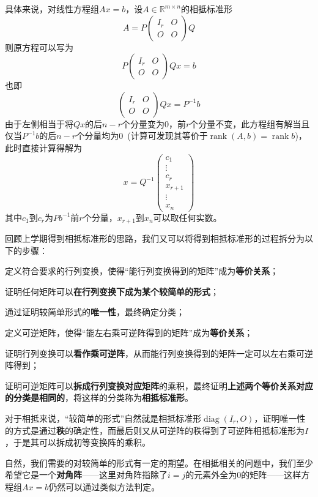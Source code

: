 \documentclass[a4paper,UTF8,fontset=windows,AutoFakeBold]{ctexart}
\DeclareMathOperator{\diag}{diag}
\DeclareMathOperator{\rank}{rank}
\begin{document}
具体来说，对线性方程组$Ax=b$，设$A\in\mathbb{R}^{m\times n}$的相抵标准形
$$A=P\begin{pmatrix}I_r&O\\O&O\end{pmatrix}Q$$
则原方程可以写为
$$P\begin{pmatrix}I_r&O\\O&O\end{pmatrix}Qx=b$$
也即
$$\begin{pmatrix}I_r&O\\O&O\end{pmatrix}Qx=P^{-1}b$$
由于左侧相当于将$Qx$的后$n-r$个分量变为0，前$r$个分量不变，此方程组有解当且仅当$P^{-1}b$的后$n-r$个分量均为0\ (计算可发现其等价于$\rank(A,b)=\rank b$)，此时直接计算得解为
$$x=Q^{-1}\begin{pmatrix}c_1\\\vdots\\c_r\\x_{r+1}\\\vdots\\x_n\end{pmatrix}$$
其中$c_1$到$c_r$为$Pb^{-1}$前$r$个分量，$x_{r+1}$到$x_n$可以取任何实数。

回顾上学期得到相抵标准形的思路，我们又可以将得到相抵标准形的过程拆分为以下的步骤：
\begin{compactitem}
    \item 定义符合要求的行列变换，使得``能行列变换得到的矩阵''成为\textbf{等价关系}；
    \item 证明任何矩阵可以\textbf{在行列变换下成为某个较简单的形式}；
    \item 通过证明较简单形式的\textbf{唯一性}，最终确定分类；
    \item 定义可逆矩阵，使得``能左右乘可逆阵得到的矩阵''成为\textbf{等价关系}；
    \item 证明行列变换可以\textbf{看作乘可逆阵}，从而能行列变换得到的矩阵一定可以左右乘可逆阵得到；
    \item 证明可逆矩阵可以\textbf{拆成行列变换对应矩阵}的乘积，最终证明\textbf{上述两个等价关系对应的分类是相同的}，将这样的分类称为\textbf{相抵标准形}。
\end{compactitem}
对于相抵来说，``较简单的形式''自然就是相抵标准形$\diag(I_r,O)$，证明唯一性的方式是通过\textbf{秩}的确定性，而最后则又从可逆阵的秩得到了可逆阵相抵标准形为$I$，于是其可以拆成初等变换阵的乘积。

自然，我们需要的对较简单的形式有一定的期望。在相抵相关的问题中，我们至少希望它是一个\textbf{对角阵}——这里对角阵指除了$i=j$的元素外全为0的矩阵——这样方程组$Ax=b$仍然可以通过类似方法判定。
\end{document}
